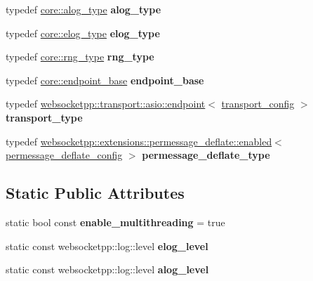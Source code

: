 \begin{DoxyCompactItemize}
\mbox{\label{structtestee__config_a6389e76c8f9e52c854b9e90501ae1ab1}} 
typedef \mbox{\hyperlink{classwebsocketpp_1_1log_1_1basic}{core\+::alog\+\_\+type}} {\bfseries alog\+\_\+type}
\item 
\mbox{\label{structtestee__config_a6cc4f2421eef3cd185e49a99294955bf}} 
typedef \mbox{\hyperlink{classwebsocketpp_1_1log_1_1basic}{core\+::elog\+\_\+type}} {\bfseries elog\+\_\+type}
\item 
\mbox{\label{structtestee__config_ae66fe318a122e964d795d81ce77b1230}} 
typedef \mbox{\hyperlink{classwebsocketpp_1_1random_1_1none_1_1int__generator}{core\+::rng\+\_\+type}} {\bfseries rng\+\_\+type}
\item 
\mbox{\label{structtestee__config_ad51c0a31f1f65737c2dede017e2d6912}} 
typedef \mbox{\hyperlink{structwebsocketpp_1_1config_1_1core_a5389422816ef3115fb8b7f4cd92d5ca3}{core\+::endpoint\+\_\+base}} {\bfseries endpoint\+\_\+base}
\item 
\mbox{\label{structtestee__config_a431277022fbca101284ed18d4cb96468}} 
typedef \mbox{\hyperlink{classwebsocketpp_1_1transport_1_1asio_1_1endpoint}{websocketpp\+::transport\+::asio\+::endpoint}}$<$ \mbox{\hyperlink{structtestee__config_1_1transport__config}{transport\+\_\+config}} $>$ {\bfseries transport\+\_\+type}
\item 
\mbox{\label{structtestee__config_a681ef2a3d6ee8448fd01af6480a52ce7}} 
typedef \mbox{\hyperlink{classwebsocketpp_1_1extensions_1_1permessage__deflate_1_1enabled}{websocketpp\+::extensions\+::permessage\+\_\+deflate\+::enabled}}$<$ \mbox{\hyperlink{structtestee__config_1_1permessage__deflate__config}{permessage\+\_\+deflate\+\_\+config}} $>$ {\bfseries permessage\+\_\+deflate\+\_\+type}
\end{DoxyCompactItemize}
\subsection*{Static Public Attributes}
\begin{DoxyCompactItemize}
\item 
\mbox{\label{structtestee__config_a4c4e9e0617fa369fbed87b5eb0325a1f}} 
static bool const {\bfseries enable\+\_\+multithreading} = true
\item 
static const websocketpp\+::log\+::level {\bfseries elog\+\_\+level}
\item 
static const websocketpp\+::log\+::level {\bfseries alog\+\_\+level}
\end{DoxyCompactItemize}


